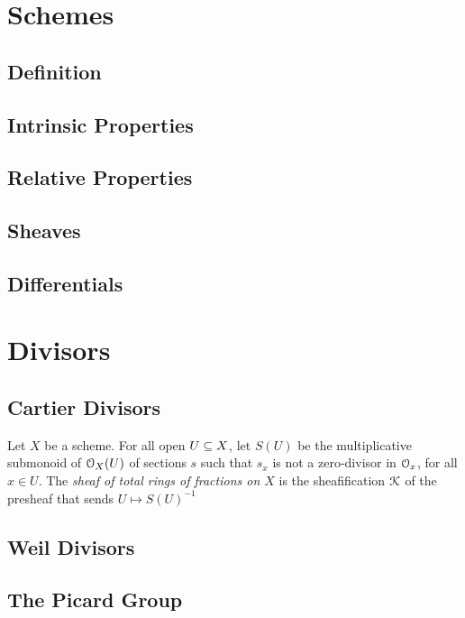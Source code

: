 \documentclass[10pt,final,oneside]{amsbook}
\numberwithin{equation}{section}
\begin{document}
\chapter{Schemes}

\section{Definition}

\section{Intrinsic Properties}

\section{Relative Properties}

\section{Sheaves}

\section{Differentials}

\chapter{Divisors}

\section{Cartier Divisors}

Let $X$ be a scheme.
For all open $U \subeq X$, let $S(U)$ be the multiplicative submonoid of $\cal{O}_X(U)$ of sections $s$ such that $s_x$ is not a zero-divisor in $\cal{O}_x$, for all $x \in U$.
The \emph{sheaf of total rings of fractions on $X$} is the sheafification $\cal{K}$ of the presheaf that sends $U \mapsto S(U)^{-1}$

\section{Weil Divisors}



\section{The Picard Group}
\end{document}
